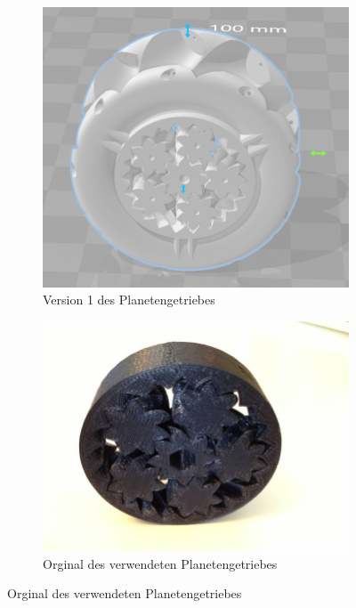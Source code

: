 \begin{figure}[H]
	\centering
	\begin{subfigure}[b]{0.4\textwidth}
		\includegraphics[width=\textwidth]{bilder/GetriebeVersion1-1.png}
		\caption{Version 1 des Planetengetriebes}
		\label{bild:gearversion1-1}
	\end{subfigure}
	\hspace{0.1\textwidth}%
	\begin{subfigure}[b]{0.4\textwidth}
		\includegraphics[width=\textwidth]{bilder/GetriebeVersion1-2.jpg}
		\caption{Orginal des verwendeten Planetengetriebes \cite{link:planetgear1}}
		\label{bild:gearversion1-2}
	\end{subfigure}
\end{figure}

